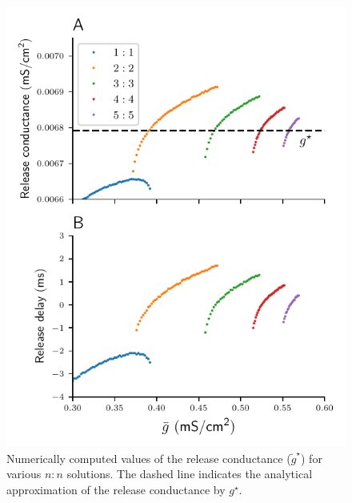 \documentclass[utf8]{frontiersFPHY} %
\begin{document}
\begin{figure}[h!]
  \centering
  \includegraphics{gstar-diag}
  \caption{Numerically computed values of the release conductance ($\tilde g^{\star}$) for various $n:n$ solutions. The dashed line indicates the analytical approximation of the release conductance by $g^{\star}$.\label{fig:gstar-diag}}
\end{figure}
\end{document}
